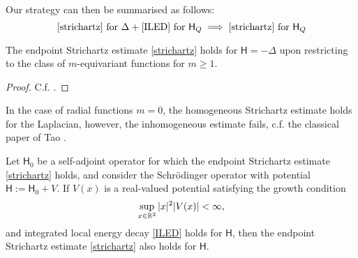 Our strategy can then be summarised as follows:
    \[
       \text{\eqref{strichartz} for $\Delta$} +\text{\eqref{ILED} for $\mathsf H_Q$} \implies \text{\eqref{strichartz} for $\mathsf H_Q$}
    \]


\begin{lemma}
    The endpoint Strichartz estimate \eqref{strichartz} holds for $\mathsf H = - \Delta$ upon restricting to the class of $m$-equivariant functions for $m \geq 1$. 
\end{lemma}

\begin{proof}
    C.f. \cite[Theorem 10.1]{GustafsonEtAl2010}.
\end{proof}

\begin{remark}
    In the case of radial functions $m = 0$, the homogeneous Strichartz estimate holds for the Laplacian, however, the inhomogeneous estimate fails, c.f. the classical paper of Tao \cite{tao2000spherically}. 
\end{remark}

\begin{lemma}
    Let $\mathsf H_0$ be a self-adjoint operator for which the endpoint Strichartz estimate \eqref{strichartz} holds, and consider the Schr\"odinger operator with potential $\mathsf H := \mathsf H_0 + V$. If $V(x)$ is a real-valued potential satisfying the growth condition 
        \begin{equation}\label{eq:growth}
            \sup_{x \in \mathbb R^2} |x|^2 |V(x)|
                < \infty, 
        \end{equation}
    and integrated local energy decay \eqref{ILED} holds for $\mathsf H$, then the endpoint Strichartz estimate \eqref{strichartz} also holds for $\mathsf H$. 
\end{lemma}

